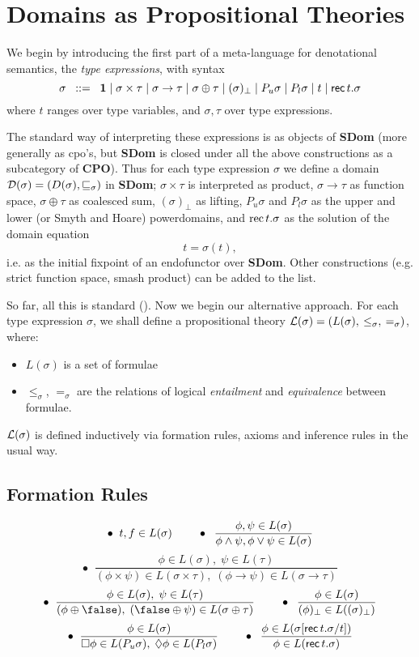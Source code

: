 \section{Domains as Propositional Theories}

We begin by introducing the first part of a meta-language for
denotational semantics, the {\em type expressions}, with syntax
\[ \sigma \;\; ::= \;\; {\bf 1} \; | \; \sigma \times \tau \; | \;
\sigma \rightarrow \tau \; | \; 
\sigma \oplus \tau \; | \; (\sigma )_{\bot} \; | \;
P_{u} \sigma \; | \; 
P_{l} \sigma \; | \; t  \; | \; 
{\sf rec} \, t.\sigma \]
where $t$ ranges over type variables, and $\sigma , \tau$ over
type expressions.

The standard way of interpreting these expressions is as objects
of  {\bf SDom} (more generally as cpo's, but {\bf SDom} is closed
under all the above constructions as a subcategory of  {\bf CPO}).
Thus for each type expression $\sigma$ we define a domain
${\cal D} ( \sigma ) = (D(\sigma ), \sqsubseteq_{\sigma} )$ in
{\bf SDom}; $\sigma \times \tau$ is interpreted as product,
$\sigma \rightarrow \tau$ as function space, $\sigma \oplus \tau$
as coalesced sum, $(\sigma )_{\bot}$ as lifting, $P_{u} \sigma$
and $P_{l} \sigma$ as the upper and lower (or Smyth and Hoare)
powerdomains, and ${\rm rec} \, t. \sigma$ as the solution of the
domain equation
\[t = \sigma (t),\]
i.e. as the initial fixpoint of an endofunctor over {\bf SDom}.
Other constructions (e.g. strict function space, smash product)
can be added to the list.

So far, all this is standard (\cite {PloLN,SP82}). 
Now we begin our alternative approach.
For each type expression $\sigma$, we shall define a propositional
theory ${\cal L}(\sigma ) = (L(\sigma ), \: \leq_{\sigma}, \: =_{\sigma})$,
where:
\begin{itemize}
\item $L(\sigma )$ is a set of formulae
\item $\leq_{\sigma}$, $=_{\sigma}$ are the relations of logical
{\em entailment} and {\em equivalence} between formulae.
\end{itemize}

${\cal L}(\sigma )$ is defined inductively via formation rules,
axioms and inference rules in the usual way.
\subsection*{Formation Rules}
\[ \bullet \;\; {\sl t, f} \in L(\sigma ) \;\;\;\;\;\;\;\;
\bullet \;\; \frac{\phi , \psi \in L(\sigma )}{\phi \wedge \psi , \phi \vee \psi
\in L(\sigma )}\]
\[\bullet \;\; \frac{\phi \in L(\sigma ), \; \psi \in L(\tau )}
{(\phi \times \psi ) \in L(\sigma \times \tau ), \;
(\phi \rightarrow \psi ) \in L(\sigma \rightarrow \tau ) } \]
\[ \bullet \;\; \frac{\phi \in L(\sigma ), \; \psi \in L(\tau )}
{(\phi \oplus \false ), \; (\false \oplus \psi ) \in L(\sigma \oplus \tau )} \;\;\;\;\;\;\;\; 
\bullet \;\; \frac{\phi \in L(\sigma )}{(\phi )_{\bot} \in L((\sigma )_{\bot})} \]
\[ \bullet \;\; \frac{\phi \in L(\sigma )}
{\Box \phi \in L(P_{u} \sigma ), \; 
\Diamond \phi \in L(P_{l} \sigma ) } \;\;\;\;\;\;\;\;
\bullet \;\; \frac{\phi \in L(\sigma [{\sf rec} \, t.\sigma / t])}
{\phi \in L({\sf rec} \, t.\sigma )} \]

